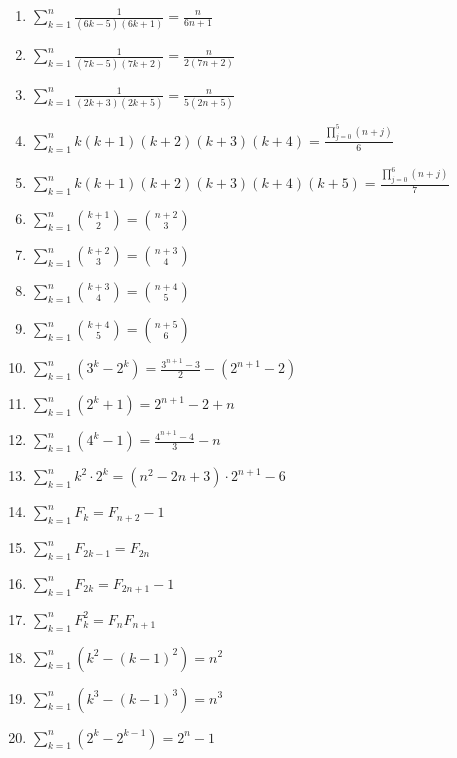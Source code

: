 \documentclass[11pt,a4paper]{article}
\begin{document}
\begin{enumerate}
\item $\displaystyle \sum_{k=1}^{n} \frac{1}{\left(6k - 5\right)\left(6k + 1\right)} = \frac{n}{6n + 1}$
\item $\displaystyle \sum_{k=1}^{n} \frac{1}{\left(7k - 5\right)\left(7k + 2\right)} = \frac{n}{2\left(7n + 2\right)}$
\item $\displaystyle \sum_{k=1}^{n} \frac{1}{\left(2k + 3\right)\left(2k + 5\right)} = \frac{n}{5\left(2n + 5\right)}$
\item $\displaystyle \sum_{k=1}^{n} k\left(k + 1\right)\left(k + 2\right)\left(k + 3\right)\left(k + 4\right) = \frac{\prod_{j=0}^{5} \left(n + j\right)}{6}$
\item $\displaystyle \sum_{k=1}^{n} k\left(k + 1\right)\left(k + 2\right)\left(k + 3\right)\left(k + 4\right)\left(k + 5\right) = \frac{\prod_{j=0}^{6} \left(n + j\right)}{7}$
\item $\displaystyle \sum_{k=1}^{n} \binom{k + 1}{2} = \binom{n + 2}{3}$
\item $\displaystyle \sum_{k=1}^{n} \binom{k + 2}{3} = \binom{n + 3}{4}$
\item $\displaystyle \sum_{k=1}^{n} \binom{k + 3}{4} = \binom{n + 4}{5}$
\item $\displaystyle \sum_{k=1}^{n} \binom{k + 4}{5} = \binom{n + 5}{6}$
\item $\displaystyle \sum_{k=1}^{n} \left(3^{k} - 2^{k}\right) = \frac{3^{n + 1} - 3}{2} - \left(2^{n + 1} - 2\right)$
\item $\displaystyle \sum_{k=1}^{n} \left(2^{k} + 1\right) = 2^{n + 1} - 2 + n$
\item $\displaystyle \sum_{k=1}^{n} \left(4^{k} - 1\right) = \frac{4^{n + 1} - 4}{3} - n$
\item $\displaystyle \sum_{k=1}^{n} k^{2} \cdot 2^{k} = \left(n^{2} - 2n + 3\right) \cdot 2^{n + 1} - 6$
\item $\displaystyle \sum_{k=1}^{n} F_{k} = F_{n + 2} - 1$
\item $\displaystyle \sum_{k=1}^{n} F_{2k - 1} = F_{2n}$
\item $\displaystyle \sum_{k=1}^{n} F_{2k} = F_{2n + 1} - 1$
\item $\displaystyle \sum_{k=1}^{n} F_{k}^{2} = F_{n}F_{n + 1}$
\item $\displaystyle \sum_{k=1}^{n} \left(k^{2} - \left(k - 1\right)^{2}\right) = n^{2}$
\item $\displaystyle \sum_{k=1}^{n} \left(k^{3} - \left(k - 1\right)^{3}\right) = n^{3}$
\item $\displaystyle \sum_{k=1}^{n} \left(2^{k} - 2^{k - 1}\right) = 2^{n} - 1$

\end{enumerate}
\end{document}
